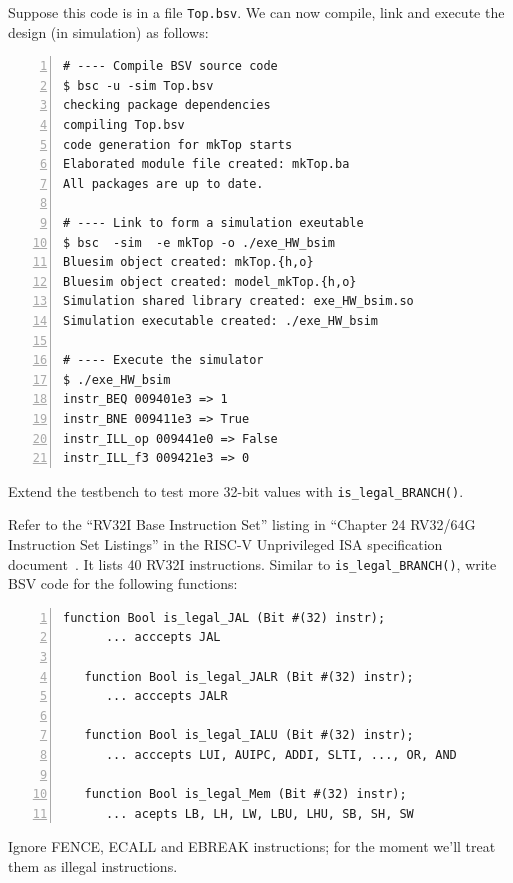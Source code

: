 Suppose this code is in a file \verb|Top.bsv|.  We can now compile,
link and execute the design (in simulation) as follows:

\begin{Verbatim}[frame=single, numbers=left]
# ---- Compile BSV source code
$ bsc -u -sim Top.bsv
checking package dependencies
compiling Top.bsv
code generation for mkTop starts
Elaborated module file created: mkTop.ba
All packages are up to date.

# ---- Link to form a simulation exeutable
$ bsc  -sim  -e mkTop -o ./exe_HW_bsim
Bluesim object created: mkTop.{h,o}
Bluesim object created: model_mkTop.{h,o}
Simulation shared library created: exe_HW_bsim.so
Simulation executable created: ./exe_HW_bsim

# ---- Execute the simulator
$ ./exe_HW_bsim
instr_BEQ 009401e3 => 1
instr_BNE 009411e3 => True
instr_ILL_op 009441e0 => False
instr_ILL_f3 009421e3 => 0
\end{Verbatim}


\hdivider

\Exercise

Extend the testbench to test more 32-bit values with
\verb|is_legal_BRANCH()|.

\Exercise

Refer to the ``RV32I Base Instruction Set'' listing in ``Chapter 24
RV32/64G Instruction Set Listings'' in the RISC-V Unprivileged ISA
specification document~\cite{RISCV_Unpriv_2019_12_13}.  It lists 40
RV32I instructions.  Similar to \verb|is_legal_BRANCH()|, write BSV
code for the following functions:

\begin{Verbatim}[frame=single, numbers=left]
   function Bool is_legal_JAL (Bit #(32) instr);
      ... acccepts JAL

   function Bool is_legal_JALR (Bit #(32) instr);
      ... acccepts JALR

   function Bool is_legal_IALU (Bit #(32) instr);
      ... acccepts LUI, AUIPC, ADDI, SLTI, ..., OR, AND

   function Bool is_legal_Mem (Bit #(32) instr);
      ... acepts LB, LH, LW, LBU, LHU, SB, SH, SW
\end{Verbatim}

Ignore FENCE, ECALL and EBREAK instructions; for the moment we'll
treat them as illegal instructions.

